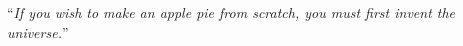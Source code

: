\documentclass[
11pt, %
oneside, %
ukrainian,
english, %
singlespacing, %
headsepline, %
]{BachelorMasterThesis} %
\begin{document}







\vspace*{0.2\textheight}

\noindent\enquote{\itshape If you wish to make an apple pie from scratch, you must first invent the universe.}\bigbreak
\end{document}
